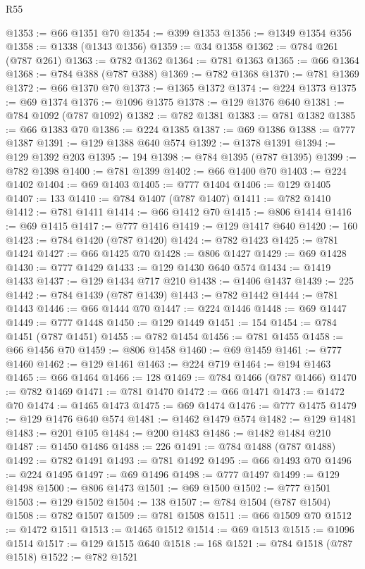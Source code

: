 \begin{lexlean}{R55}
\begin{coremodule}
{{{{{{{{{{{{{{{{{{{{{{{{{{{{{{{{{{{{{{{{{{{{{{{{{{{{{{{{{{{{{{{{{{{{{{{{{{{{{{{{@1353 := @66 @1351 @70
@1354 := @399 @1353
@1356 := @1349 @1354 @356
@1358 := @1338 (@1343 @1356)
@1359 := @34 @1358
@1362 := @784 @261 (@787 @261)
@1363 := @782 @1362
@1364 := @781 @1363
@1365 := @66 @1364
@1368 := @784 @388 (@787 @388)
@1369 := @782 @1368
@1370 := @781 @1369
@1372 := @66 @1370 @70
@1373 := @1365 @1372
@1374 := @224 @1373
@1375 := @69 @1374
@1376 := @1096 @1375
@1378 := @129 @1376 @640
@1381 := @784 @1092 (@787 @1092)
@1382 := @782 @1381
@1383 := @781 @1382
@1385 := @66 @1383 @70
@1386 := @224 @1385
@1387 := @69 @1386
@1388 := @777 @1387
@1391 := @129 @1388 @640 @574
@1392 := @1378 @1391
@1394 := @129 @1392 @203
@1395 := 194
@1398 := @784 @1395 (@787 @1395)
@1399 := @782 @1398
@1400 := @781 @1399
@1402 := @66 @1400 @70
@1403 := @224 @1402
@1404 := @69 @1403
@1405 := @777 @1404
@1406 := @129 @1405
@1407 := 133
@1410 := @784 @1407 (@787 @1407)
@1411 := @782 @1410
@1412 := @781 @1411
@1414 := @66 @1412 @70
@1415 := @806 @1414
@1416 := @69 @1415
@1417 := @777 @1416
@1419 := @129 @1417 @640
@1420 := 160
@1423 := @784 @1420 (@787 @1420)
@1424 := @782 @1423
@1425 := @781 @1424
@1427 := @66 @1425 @70
@1428 := @806 @1427
@1429 := @69 @1428
@1430 := @777 @1429
@1433 := @129 @1430 @640 @574
@1434 := @1419 @1433
@1437 := @129 @1434 @717 @210
@1438 := @1406 @1437
@1439 := 225
@1442 := @784 @1439 (@787 @1439)
@1443 := @782 @1442
@1444 := @781 @1443
@1446 := @66 @1444 @70
@1447 := @224 @1446
@1448 := @69 @1447
@1449 := @777 @1448
@1450 := @129 @1449
@1451 := 154
@1454 := @784 @1451 (@787 @1451)
@1455 := @782 @1454
@1456 := @781 @1455
@1458 := @66 @1456 @70
@1459 := @806 @1458
@1460 := @69 @1459
@1461 := @777 @1460
@1462 := @129 @1461
@1463 := @224 @719
@1464 := @194 @1463
@1465 := @66 @1464
@1466 := 128
@1469 := @784 @1466 (@787 @1466)
@1470 := @782 @1469
@1471 := @781 @1470
@1472 := @66 @1471
@1473 := @1472 @70
@1474 := @1465 @1473
@1475 := @69 @1474
@1476 := @777 @1475
@1479 := @129 @1476 @640 @574
@1481 := @1462 @1479 @574
@1482 := @129 @1481
@1483 := @201 @105
@1484 := @200 @1483
@1486 := @1482 @1484 @210
@1487 := @1450 @1486
@1488 := 226
@1491 := @784 @1488 (@787 @1488)
@1492 := @782 @1491
@1493 := @781 @1492
@1495 := @66 @1493 @70
@1496 := @224 @1495
@1497 := @69 @1496
@1498 := @777 @1497
@1499 := @129 @1498
@1500 := @806 @1473
@1501 := @69 @1500
@1502 := @777 @1501
@1503 := @129 @1502
@1504 := 138
@1507 := @784 @1504 (@787 @1504)
@1508 := @782 @1507
@1509 := @781 @1508
@1511 := @66 @1509 @70
@1512 := @1472 @1511
@1513 := @1465 @1512
@1514 := @69 @1513
@1515 := @1096 @1514
@1517 := @129 @1515 @640
@1518 := 168
@1521 := @784 @1518 (@787 @1518)
@1522 := @782 @1521
}}}}}}}}}}}}}}}}}}}}}}}}}}}}}}}}}}}}}}}}}}}}}}}}}}}}}}}}}}}}}}}}}}}}}}}}}}}}}}}}
\end{coremodule}
\end{lexlean}
